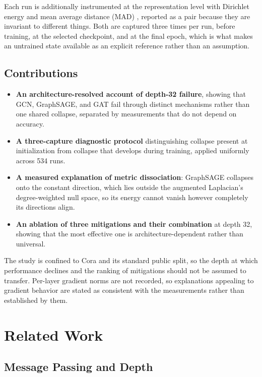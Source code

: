 \documentclass[
  conference]{IEEEtran}
\providecommand{\tightlist}{%
  \setlength{\itemsep}{0pt}\setlength{\parskip}{0pt}}
\begin{document}
Each run is additionally instrumented at the representation level with
Dirichlet energy and mean average distance (MAD)
\citep{chen2020measuring}, reported as a pair because they are invariant
to different things. Both are captured three times per run, before
training, at the selected checkpoint, and at the final epoch, which is
what makes an untrained state available as an explicit reference rather
than an assumption.

\subsection{Contributions}\label{contributions}

\begin{itemize}
\tightlist
\item
  \textbf{An architecture-resolved account of depth-32 failure}, showing
  that GCN, GraphSAGE, and GAT fail through distinct mechanisms rather
  than one shared collapse, separated by measurements that do not depend
  on accuracy.
\item
  \textbf{A three-capture diagnostic protocol} distinguishing collapse
  present at initialization from collapse that develops during training,
  applied uniformly across 534 runs.
\item
  \textbf{A measured explanation of metric dissociation}: GraphSAGE
  collapses onto the constant direction, which lies outside the
  augmented Laplacian's degree-weighted null space, so its energy cannot
  vanish however completely its directions align.
\item
  \textbf{An ablation of three mitigations and their combination} at
  depth 32, showing that the most effective one is
  architecture-dependent rather than universal.
\end{itemize}

The study is confined to Cora and its standard public split, so the
depth at which performance declines and the ranking of mitigations
should not be assumed to transfer. Per-layer gradient norms are not
recorded, so explanations appealing to gradient behavior are stated as
consistent with the measurements rather than established by them.

\section{Related Work}\label{related-work}

\subsection{Message Passing and Depth}\label{message-passing-and-depth}
\end{document}
